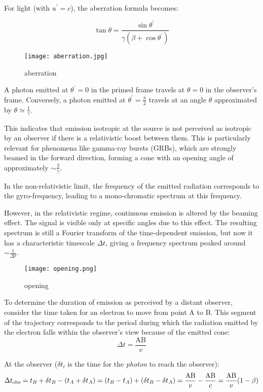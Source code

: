 For light (with \( u^\prime = c \)), the aberration formula becomes:
%
\begin{remark}
\[
\tan \theta = \frac{\sin \theta^\prime}{\gamma(\beta + \cos \theta^\prime)} 
\]
\end{remark}

\begin{figure}[t]
\centering
\texttt{[image: aberration.jpg]}
\caption{aberration}
\end{figure}

A photon emitted at \( \theta^\prime = 0 \) in the primed frame travels at \( \theta = 0 \) in the observer's frame. Conversely, a photon emitted at \( \theta^\prime = \frac{\pi}{2} \) travels at an angle \( \theta \) approximated by \( \theta \simeq \frac{1}{\gamma} \).

This indicates that emission isotropic at the source is not perceived as isotropic by an observer if there is a relativistic boost between them. This is particularly relevant for phenomena like gamma-ray bursts (GRBs), which are strongly beamed in the forward direction, forming a cone with an opening angle of approximately \( \sim \frac{2}{\gamma} \).

In the non-relativistic limit, the frequency of the emitted radiation corresponds to the gyro-frequency, leading to a mono-chromatic spectrum at this frequency.

However, in the relativistic regime, continuous emission is altered by the beaming effect. The signal is visible only at specific angles due to this effect. The resulting spectrum is still a Fourier transform of the time-dependent emission, but now it has a characteristic timescale \(  \Delta t \), giving a frequency spectrum peaked around \( \sim \frac{1}{\Delta t} \).

\begin{figure}[t]
\centering
\texttt{[image: opening.png]}
\caption{opening}
\end{figure}

To determine the duration of emission as perceived by a distant observer, consider the time taken for an electron to move from point A to B. This segment of the trajectory corresponds to the period during which the radiation emitted by the electron falls within the observer's view because of the emitted cone:
%
\[
\Delta t = \frac{\text{AB}}{v}
\]

At the observer ($\delta t_i$ is the time for the \emph{photon} to reach the observer): 
%
\[
\Delta t_{\rm obs} = t_B + \delta t_B - (t_A  + \delta t_A) = (t_B - t_A) + (\delta t_B - \delta t_A) = \frac{\text{AB}}{v} - \frac{\text{AB}}{c} = \frac{\text{AB}}{v} (1-\beta)
\]


